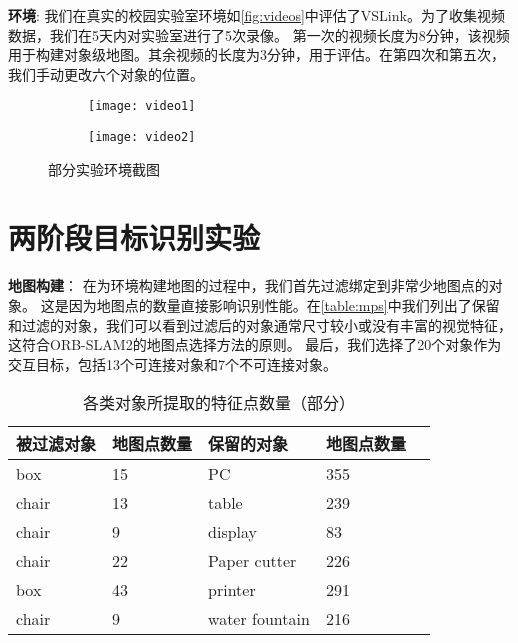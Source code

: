 \textbf{环境}: 我们在真实的校园实验室环境如\autoref{fig:videos}中评估了VSLink。为了收集视频数据，我们在5天内对实验室进行了5次录像。
第一次的视频长度为8分钟，该视频用于构建对象级地图。其余视频的长度为3分钟，用于评估。在第四次和第五次，我们手动更改六个对象的位置。

\begin{figure}[htbp]
	\centering
	\begin{subfigure}{.49\linewidth}
		\texttt{[image: video1]}
		\caption{}
	\end{subfigure}
	\begin{subfigure}{.49\linewidth}
		\texttt{[image: video2]}
		\caption{}
	\end{subfigure}
	\caption{部分实验环境截图}\label{fig:videos}
\end{figure}

\section{两阶段目标识别实验}

\textbf{地图构建}：
在为环境构建地图的过程中，我们首先过滤绑定到非常少地图点的对象。
这是因为地图点的数量直接影响识别性能。在\autoref{table:mps}中我们列出了保留和过滤的对象，我们可以看到过滤后的对象通常尺寸较小或没有丰富的视觉特征，这符合ORB-SLAM2\cite{mur2017orb}的地图点选择方法的原则。
最后，我们选择了20个对象作为交互目标，包括13个可连接对象和7个不可连接对象。

\begin{table}[htbp]
	\caption{各类对象所提取的特征点数量（部分）}  \label{table:mps} 
	\begin{center}  
		\begin{tabular}{|l|l|l|l| p{4cm}|}  
			\hline  
			\textbf{被过滤对象} & \textbf{地图点数量} & \textbf{保留的对象} & \textbf{地图点数量}\\ \hline  
			box & 15 & PC & 355  \\ \hline 
			chair & 13 & table & 239  \\ \hline 
			chair & 9 & display & 83  \\ \hline  
			chair & 22 & Paper cutter & 226  \\ \hline  
			box & 43 & printer & 291  \\ \hline  
			chair & 9 & water fountain & 216  \\ \hline  
		\end{tabular}  
	\end{center}  
\end{table} 

